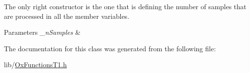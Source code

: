 The only right constructor is the one that is defining the number of samples that are processed in all the member variables. 


\begin{DoxyParams}{Parameters}
{\em \+\_\+n\+Samples} & \\
\hline
\end{DoxyParams}


The documentation for this class was generated from the following file\+:\begin{DoxyCompactItemize}
\item 
lib/\mbox{\hyperlink{_ox_functions_t1_8h}{Ox\+Functions\+T1.\+h}}\end{DoxyCompactItemize}
